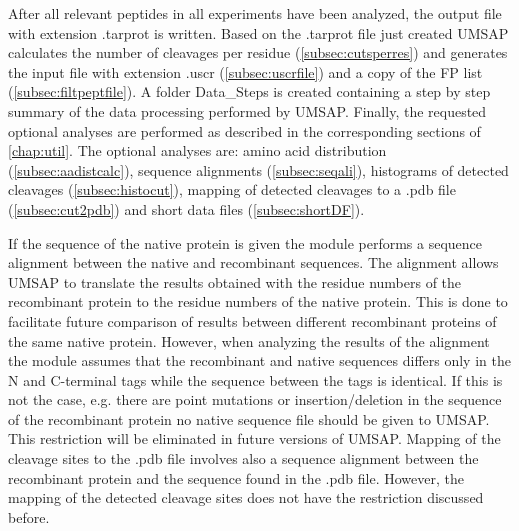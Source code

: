 After all relevant peptides in all experiments have been analyzed, the output file with extension .tarprot is written. Based on the .tarprot file just created UMSAP calculates the number of cleavages per residue (\autoref{subsec:cutsperres}) and generates the input file with extension .uscr (\autoref{subsec:uscrfile}) and a copy of the FP list (\autoref{subsec:filtpeptfile}). A folder Data{\_}Steps is created containing a step by step summary of the data processing performed by UMSAP. Finally, the requested optional analyses are performed as described in the corresponding sections of \autoref{chap:util}. The optional analyses are: amino acid distribution (\autoref{subsec:aadistcalc}), sequence alignments (\autoref{subsec:seqali}), histograms of detected cleavages (\autoref{subsec:histocut}), mapping of detected cleavages to a .pdb file (\autoref{subsec:cut2pdb}) and short data files (\autoref{subsec:shortDF}).

If the sequence of the native protein is given the module performs a sequence alignment between the native and recombinant sequences. The alignment allows UMSAP to translate the results obtained with the residue numbers of the recombinant protein to the residue numbers of the native protein. This is done to facilitate future comparison of results between different recombinant proteins of the same native protein. However, when analyzing the results of the alignment the module assumes that the recombinant and native sequences differs only in the N and C-terminal tags while the sequence between the tags is identical. If this is not the case, e.g. there are point mutations or insertion/deletion in the sequence of the recombinant protein no native sequence file should be given to UMSAP. This restriction will be eliminated in future versions of UMSAP. Mapping of the cleavage sites to the .pdb file involves also a sequence alignment between the recombinant protein and the sequence found in the .pdb file. However, the mapping of the detected cleavage sites does not have the restriction discussed before. 

